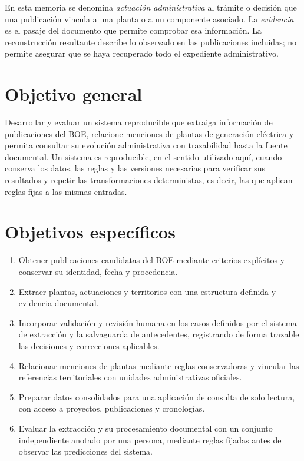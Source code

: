 En esta memoria se denomina \emph{actuación administrativa} al trámite o
decisión que una publicación vincula a una planta o a un componente asociado.
La \emph{evidencia} es el pasaje del documento que permite comprobar esa
información. La reconstrucción resultante describe lo observado en las
publicaciones incluidas; no permite asegurar que se haya recuperado todo el
expediente administrativo.

\section{Objetivo general}
Desarrollar y evaluar un sistema reproducible que extraiga información de
publicaciones del BOE, relacione menciones de plantas de generación eléctrica
y permita consultar su evolución administrativa con trazabilidad hasta la
fuente documental. Un sistema es reproducible, en el sentido utilizado aquí,
cuando conserva los datos, las reglas y las versiones necesarias para
verificar sus resultados y repetir las transformaciones deterministas, es
decir, las que aplican reglas fijas a las mismas entradas.

\section{Objetivos específicos}
\begin{enumerate}
\item Obtener publicaciones candidatas del BOE mediante criterios explícitos
y conservar su identidad, fecha y procedencia.
\item Extraer plantas, actuaciones y territorios con una estructura definida
y evidencia documental.
\item Incorporar validación y revisión humana en los casos definidos por el
sistema de extracción y la salvaguarda de antecedentes, registrando de forma
trazable las decisiones y correcciones aplicables.
\item Relacionar menciones de plantas mediante reglas conservadoras y
vincular las referencias territoriales con unidades administrativas oficiales.
\item Preparar datos consolidados para una aplicación de consulta de solo
lectura, con acceso a proyectos, publicaciones y cronologías.
\item Evaluar la extracción y su procesamiento documental con un conjunto
independiente anotado por una persona, mediante reglas fijadas antes de
observar las predicciones del sistema.
\end{enumerate}

